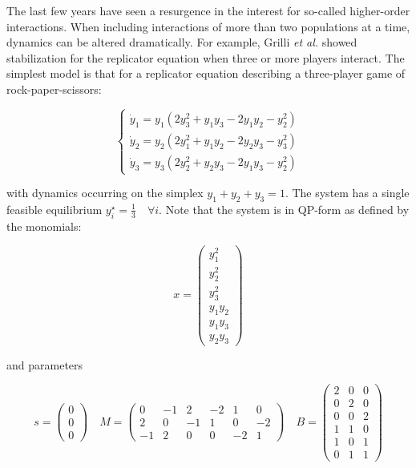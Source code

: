 \documentclass{article}
\begin{document}
\label{sec:hoi}

The last few years have seen a resurgence in the interest for so-called
higher-order interactions. When including interactions of more than two
populations at a time, dynamics can be altered dramatically. For
example, Grilli \textit{et al.} showed stabilization for the replicator
equation when three or more players interact. The simplest model is that
for a replicator equation describing a three-player game of
rock-paper-scissors:

\begin{equation}
\label{eq:rpshoi}
\begin{cases}
\dot{y}_1 = y_1 (2 y_3^2 + y_1 y_3 - 2 y_1 y_2 - y_2^2)\\
\dot{y}_2 = y_2 (2 y_1^2 + y_1 y_2 - 2 y_2 y_3 - y_3^2)\\
\dot{y}_3 = y_3 (2 y_2^2 + y_2 y_3 - 2 y_1 y_3 - y_2^2)
\end{cases}
\end{equation}

with dynamics occurring on the simplex \(y_1 + y_2 + y_3 = 1\). The
system has a single feasible equilibrium
\(y_i^\star = \frac{1}{3} \quad \forall i\). Note that the system is in
QP-form as defined by the monomials:

\begin{equation}
\label{eq:rpshoimon}
x = 
\begin{pmatrix}
y_1^2\\ y_2^2 \\ y_3^2 \\ y_1 y_2 \\ y_1 y_3 \\ y_2 y_3
\end{pmatrix} 
\end{equation}

and parameters

\begin{equation}
\label{eq:rpshoiqp}
s = \begin{pmatrix}
0\\
0\\
0
\end{pmatrix} \quad 
M = \begin{pmatrix}
0 & -1 & 2 & -2 & 1 & 0\\
2 & 0 & -1 & 1 & 0 & -2\\
-1 & 2 & 0 & 0 & -2 & 1
\end{pmatrix} \quad
B = \begin{pmatrix}
2 & 0 & 0 \\
0 & 2 & 0 \\
0 & 0 & 2 \\
1 & 1 & 0 \\
1 & 0 & 1 \\
0 & 1 & 1
\end{pmatrix}
\end{equation}
\end{document}
